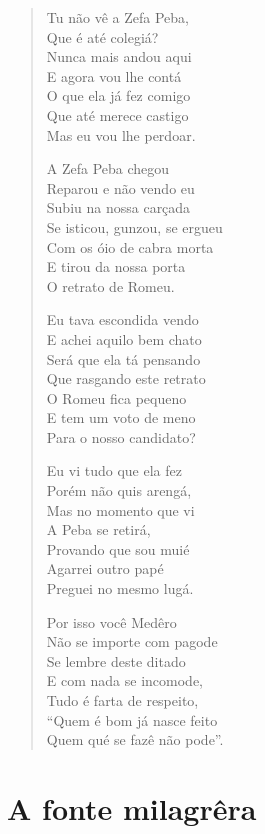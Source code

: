 \begin{verse}
Tu não vê a Zefa Peba,\\
Que é até colegiá?\\
Nunca mais andou aqui\\
E agora vou lhe contá\\
O que ela já fez comigo\\
Que até merece castigo\\
Mas eu vou lhe perdoar.

A Zefa Peba chegou\\
Reparou e não vendo eu\\
Subiu na nossa carçada\\
Se isticou, gunzou, se ergueu\\
Com os óio de cabra morta\\
E tirou da nossa porta\\
O retrato de Romeu.

Eu tava escondida vendo\\
E achei aquilo bem chato\\
Será que ela tá pensando\\
Que rasgando este retrato\\
O Romeu fica pequeno\\
E tem um voto de meno\\
Para o nosso candidato?

Eu vi tudo que ela fez\\
Porém não quis arengá,\\
Mas no momento que vi\\
A Peba se retirá,\\
Provando que sou muié\\
Agarrei outro papé\\
Preguei no mesmo lugá.

Por isso você Medêro\\
Não se importe com pagode\\
Se lembre deste ditado\\
E com nada se incomode,\\
Tudo é farta de respeito,\\
``Quem é bom já nasce feito\\
Quem qué se fazê não pode''.
\end{verse}

\chapter{A fonte milagrêra}

